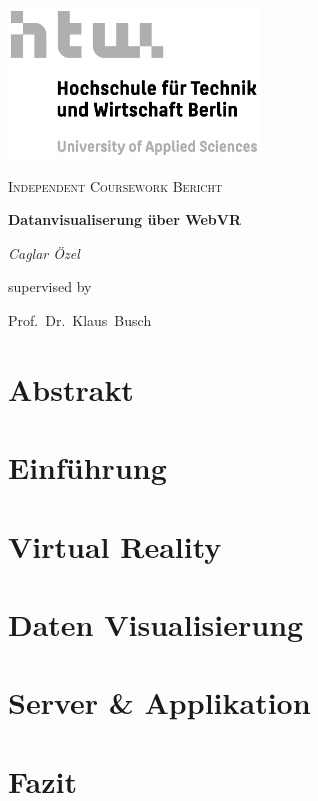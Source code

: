 \documentclass[a4paper, 11pt, oneside, onecolumn, final, openany]{report}
\begin{document}
    \begin{titlepage}
        \begin{center}
            \includegraphics[width=0.5\textwidth]{htw-logo.jpg}\par\vspace{1cm}
            \vspace{1cm}
            {\scshape\Large Independent Coursework Bericht\par}

            \vspace{1.5cm}
            {\Large\bfseries Datanvisualiserung über WebVR  }

            \vspace{2cm}
            {\Large\itshape Caglar Özel\par}

            \vfill

            supervised by\par
            Prof.\ Dr.\ Klaus\ Busch
            \vfill
        \end{center}
    \end{titlepage}

    \tableofcontents

    \newpage

    \chapter{Abstrakt}
    

    \chapter{Einführung}
    

    \chapter{Virtual Reality}
    
    
    \chapter{Daten Visualisierung}
    

    \chapter{Server \& Applikation}
    

    \chapter{Fazit}
    

    \newpage

    
    
\end{document}
